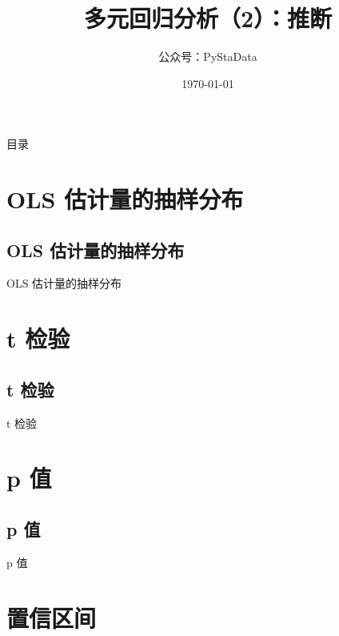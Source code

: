 \documentclass[UTF8]{ctexbeamer}
\begin{document}
\title{多元回归分析（2）：推断}
\author{公众号：PyStaData}
\date{\today}

\frame{\titlepage} %


\begin{frame}{目录}
\begin{multicols}{2}
  \tableofcontents
\end{multicols}
\end{frame}


\section{OLS 估计量的抽样分布}
\subsection{OLS 估计量的抽样分布}
\begin{frame}{OLS 估计量的抽样分布}
\end{frame}


\section{t 检验}
\subsection{t 检验}
\begin{frame}{t 检验}
\end{frame}

\section{p 值}
\subsection{p 值}
\begin{frame}{p 值}
\end{frame}



\section{置信区间}
\end{document}
